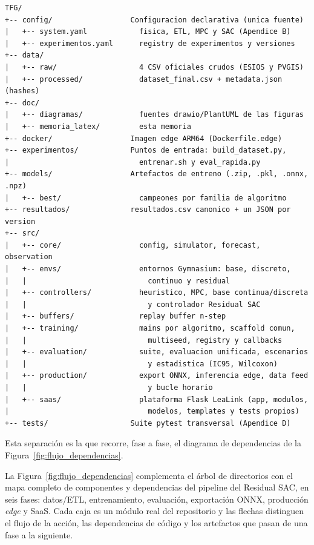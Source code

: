 \documentclass[12pt, a4paper, twoside]{report}
\begin{document}
\begin{lstlisting}[language={}, basicstyle=\scriptsize\ttfamily, numbers=none]
TFG/
+-- config/                  Configuracion declarativa (unica fuente)
|   +-- system.yaml            fisica, ETL, MPC y SAC (Apendice B)
|   +-- experimentos.yaml      registry de experimentos y versiones
+-- data/
|   +-- raw/                   4 CSV oficiales crudos (ESIOS y PVGIS)
|   +-- processed/             dataset_final.csv + metadata.json (hashes)
+-- doc/
|   +-- diagramas/             fuentes drawio/PlantUML de las figuras
|   +-- memoria_latex/         esta memoria
+-- docker/                  Imagen edge ARM64 (Dockerfile.edge)
+-- experimentos/            Puntos de entrada: build_dataset.py,
|                              entrenar.sh y eval_rapida.py
+-- models/                  Artefactos de entreno (.zip, .pkl, .onnx, .npz)
|   +-- best/                  campeones por familia de algoritmo
+-- resultados/              resultados.csv canonico + un JSON por version
+-- src/
|   +-- core/                  config, simulator, forecast, observation
|   +-- envs/                  entornos Gymnasium: base, discreto,
|   |                            continuo y residual
|   +-- controllers/           heuristico, MPC, base continua/discreta
|   |                            y controlador Residual SAC
|   +-- buffers/               replay buffer n-step
|   +-- training/              mains por algoritmo, scaffold comun,
|   |                            multiseed, registry y callbacks
|   +-- evaluation/            suite, evaluacion unificada, escenarios
|   |                            y estadistica (IC95, Wilcoxon)
|   +-- production/            export ONNX, inferencia edge, data feed
|   |                            y bucle horario
|   +-- saas/                  plataforma Flask LeaLink (app, modulos,
|                                modelos, templates y tests propios)
+-- tests/                   Suite pytest transversal (Apendice D)
\end{lstlisting}

Esta separación es la que recorre, fase a fase, el diagrama de dependencias
de la Figura~\ref{fig:flujo_dependencias}.

La Figura~\ref{fig:flujo_dependencias} complementa el árbol de directorios con
el mapa completo de componentes y dependencias del pipeline del Residual SAC,
en seis fases: datos/ETL, entrenamiento, evaluación, exportación ONNX,
producción \textit{edge} y SaaS. Cada caja es un módulo real del repositorio y
las flechas distinguen el flujo de la acción, las dependencias de código y los
artefactos que pasan de una fase a la siguiente.
\end{document}
